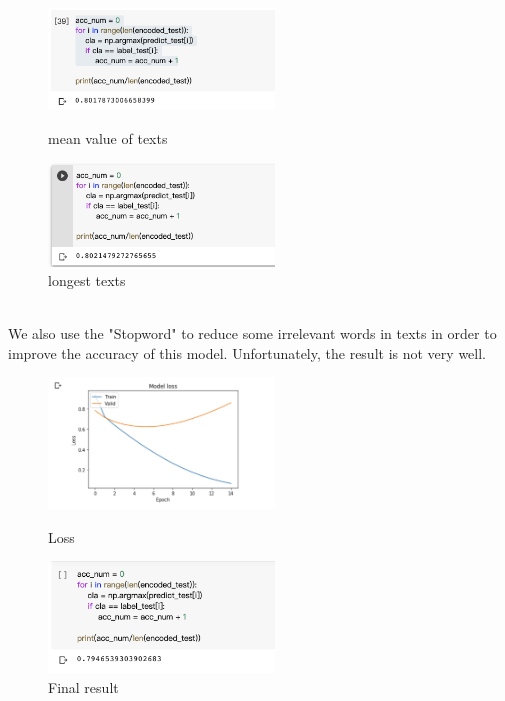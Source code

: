 \documentclass{article}
\begin{document}
\begin{figure}[h]
\centering
\begin{minipage}[t]{0.48\textwidth}
\centering
\includegraphics[width=6cm]{m3.png}
\caption{mean value of texts}
\end{minipage}
\begin{minipage}[t]{0.48\textwidth}
\centering
\includegraphics[width=6cm]{a3.png}
\caption{longest texts}
\end{minipage}
\end{figure}\\
We also use the "Stopword" to reduce some irrelevant words in texts in order to improve the accuracy of this model. Unfortunately, the result is not very well.\\
\begin{figure}[h]
\centering
\begin{minipage}[t]{0.48\textwidth}
\centering
\includegraphics[width=6cm]{s4.png}
\caption{Loss}
\end{minipage}
\begin{minipage}[t]{0.48\textwidth}
\centering
\includegraphics[width=6cm]{s2.png}
\caption{Final result}
\end{minipage}
\end{figure}
\end{document}
